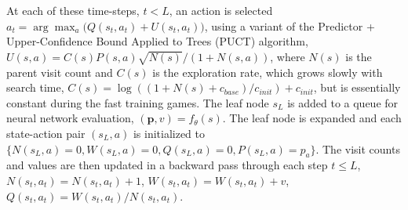 At each of these time-steps, $t < L$, an action is selected $a_t = \operatorname{arg} \operatorname{max}_a \big(Q(s_t, a_t) + U(s_t, a_t)\big)$, using a variant of the Predictor + Upper-Confidence Bound Applied to Trees (PUCT) algorithm, $U(s, a) =  C(s) P(s, a) \sqrt{N(s)} / (1 + N(s, a))$, where $N(s)$ is the parent visit count and $C(s)$ is the exploration rate, which grows slowly with search time, $C(s) = \log\left((1 + N(s) + c_{base}) / c_{init}\right) + c_{init}$, but is essentially constant during the fast training games. The leaf node $s_L$ is added to a queue for neural network evaluation, $(\mathbf{p}, v) = f_\theta(s)$. The leaf node is expanded and each state-action pair $(s_L, a)$ is initialized to $\{N(s_L, a) = 0, W(s_L, a) = 0, Q(s_L, a) = 0, P(s_L, a) = p_a\}$. The visit counts and values are then updated in a backward pass through each step $t \leq L$, $N(s_t, a_t) = N(s_t, a_t) + 1$, $W(s_t, a_t) = W(s_t, a_t) + v$, $Q(s_t, a_t) = W(s_t,a_t) / N(s_t,a_t)$.





